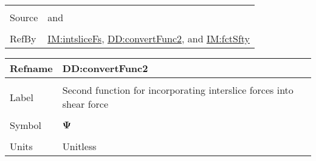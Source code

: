 \documentclass[12pt]{article}
\begin{document}
\begin{minipage}{\textwidth}
\begin{tabular}{>{\raggedright}p{}>{\raggedright\arraybackslash}p{}}
\\ \midrule \\
Source & \cite{chen2005} and \cite{karchewski2012}
         
\\ \midrule \\
RefBy & \hyperref[IM:intsliceFs]{IM:intsliceFs}, \hyperref[DD:convertFunc2]{DD:convertFunc2}, and \hyperref[IM:fctSfty]{IM:fctSfty}
        
\\ \bottomrule
\end{tabular}
\end{minipage}

\vspace{\baselineskip}
\noindent
\begin{minipage}{\textwidth}
\begin{tabular}{>{\raggedright}p{}>{\raggedright\arraybackslash}p{}}
\toprule \textbf{Refname} & \textbf{DD:convertFunc2}
\label{DD:convertFunc2}
\\ \midrule \\
Label & Second function for incorporating interslice forces into shear force
        
\\ \midrule \\
Symbol & $\symbf{Ψ}$
         
\\ \midrule \\
Units & Unitless
        

\end{tabular}
\end{minipage}
\end{document}
